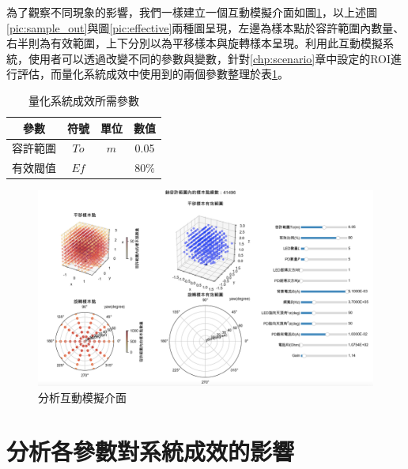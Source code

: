 為了觀察不同現象的影響，我們一樣建立一個互動模擬介面如圖\ref{pic:analysis_interactive}，以上述圖\ref{pic:sample_out}與圖\ref{pic:effective}兩種圖呈現，左邊為樣本點於容許範圍內數量、右半則為有效範圍，上下分別以為平移樣本與旋轉樣本呈現。利用此互動模擬系統，使用者可以透過改變不同的參數與變數，針對\ref{chp:scenario}章中設定的ROI進行評估，而量化系統成效中使用到的兩個參數整理於表\ref{tab:para_evaluate}。

\begin{table}[htpb]
    \begin{center}
      \caption{量化系統成效所需參數}
      \label{tab:para_evaluate}
      \begin{tabular}{c|c|c|c} %
        \textbf{參數} & \textbf{符號}&\textbf{單位}&\textbf{數值}\\
       \hline
       容許範圍 & $To$ &$m$& 0.05 \\
       有效閥值 & $Ef$ && $80\%$\\
     \end{tabular}
   \end{center}
 \end{table}

\begin{figure}[htpb]
    \centering
    \includegraphics[width=15cm]{ch4pic/analysis_interactive.png}
    \caption{分析互動模擬介面}
    \label{pic:analysis_interactive}
\end{figure}





\section{分析各參數對系統成效的影響}
\label{chp:para_effect}

